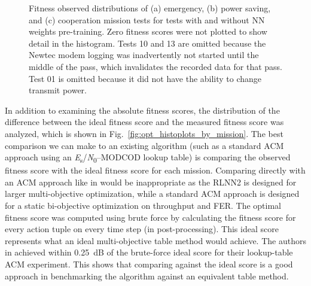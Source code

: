 \documentclass[journal]{IEEEtran}
\let\MYoriglatexcaption\caption
\renewcommand{\caption}[2][\relax]{\MYoriglatexcaption[#2]{#2}}
\begin{document}
\begin{figure}[p]
	\centering
 	\hfill
 	\hfill
 	\caption{Fitness observed distributions of (a) emergency, (b) power saving, and (c) cooperation mission tests for tests with and without NN weights pre-training.  Zero fitness scores were not plotted to show detail in the histogram.  Tests 10 and 13 are omitted because the Newtec modem logging was inadvertently not started until the middle of the pass, which invalidates the recorded data for that pass.  Test 01 is omitted because it did not have the ability to change transmit power.}
 	\label{fig:train_histoplots_by_mission}
\end{figure}

In addition to examining the absolute fitness scores, the distribution of the difference between the ideal fitness score and the measured fitness score was analyzed, which is shown in Fig.~\ref{fig:opt_histoplots_by_mission}.  The best comparison we can make to an existing algorithm (such as a standard ACM approach using an \textit{E}\textsubscript{s}/\textit{N}\textsubscript{0}--MODCOD lookup table) is comparing the observed fitness score with the ideal fitness score for each mission.  Comparing directly with an ACM approach like in \cite{downey-paper} would be inappropriate as the RLNN2 is designed for larger multi-objective optimization, while a standard ACM approach is designed for a static bi-objective optimization on throughput and FER.  The optimal fitness score was computed using brute force by calculating the fitness score for every action tuple on every time step (in post-processing).  This ideal score represents what an ideal multi-objective table method would achieve.  The authors in \cite{downey-paper} achieved within 0.25~dB of the brute-force ideal score for their lookup-table ACM experiment.  This shows that comparing against the ideal score is a good approach in benchmarking the algorithm against an equivalent table method.
\end{document}
